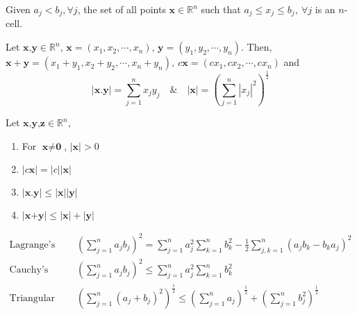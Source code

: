 	\begin{definition}
		Given $a_j < b_j, \forall j$, the set of all points $\textbf{x} \in \mathbb{R}^n$ such that $a_j \le x_j \le b_j,\ \forall j$ is an $n$-cell.
	\end{definition}
	\begin{definition}
		Let $\textbf{x,y} \in \mathbb{R}^n$, $ \textbf{x} = (x_1, x_2, \cdots, x_n)$, $\textbf{y} = (y_1, y_2, \cdots, y_n)$. Then, $\textbf{x} + \textbf{y} = (x_1 + y_1, x_2 + y_2, \cdots, x_n + y_n),\ c\textbf{x} = (cx_1, cx_2, \cdots, cx_n)$ and
		$$|\textbf{x}.\textbf{y}| = \sum_{j=1}^n x_j y_j \quad \& \quad | \textbf{x} | = \left( \sum_{j=1}^n |x_j|^2 \right)^\frac{1}{2}$$
	\end{definition}
	\begin{remark} Let $\textbf{x,y,z} \in \mathbb{R}^n$,
		\begin{enumerate}
			\item For $\textbf{x} \ne \textbf{0}$, $|\textbf{x}| > 0$
			\item $|c\textbf{x}| = |c||\textbf{x}|$
			\item $|\textbf{x.y}| \le |\textbf{x}||\textbf{y}|$
			\item $|\textbf{x+y}| \le |\textbf{x}|+|\textbf{y}|$
		\end{enumerate}
	\end{remark}
	\begin{remark}
		\begin{align}
			\text{Lagrange's identity, } & \left( \sum_{j = 1}^n a_jb_j \right)^2 = \sum_{j = 1}^n a_j^2 \sum_{k = 1}^n b_k^2 - \frac{1}{2}\sum_{j,k=1}^n (a_jb_k - b_ka_j)^2\\
			\text{Cauchy's inequality, } & \left( \sum_{j = 1}^n a_jb_j \right)^2 \le \sum_{ j = 1}^n a_j^2 \sum_{k = 1}^n b_k^2\\
			\text{Triangular inequality, } & \left( \sum_{j = 1}^n (a_j + b_j)^2 \right)^\frac{1}{2} \le \left( \sum_{j = 1}^n a_j \right)^\frac{1}{2} + \left( \sum_{j = 1}^n b_j^2 \right)^\frac{1}{2}
		\end{align}
	\end{remark}
